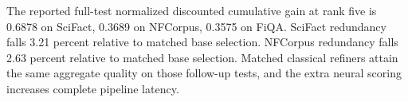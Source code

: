 The reported full-test normalized discounted cumulative gain at rank five is 0.6878 on SciFact, 0.3689 on NFCorpus, 0.3575 on FiQA. SciFact redundancy falls 3.21 percent relative to matched base selection. NFCorpus redundancy falls 2.63 percent relative to matched base selection. Matched classical refiners attain the same aggregate quality on those follow-up tests, and the extra neural scoring increases complete pipeline latency.
